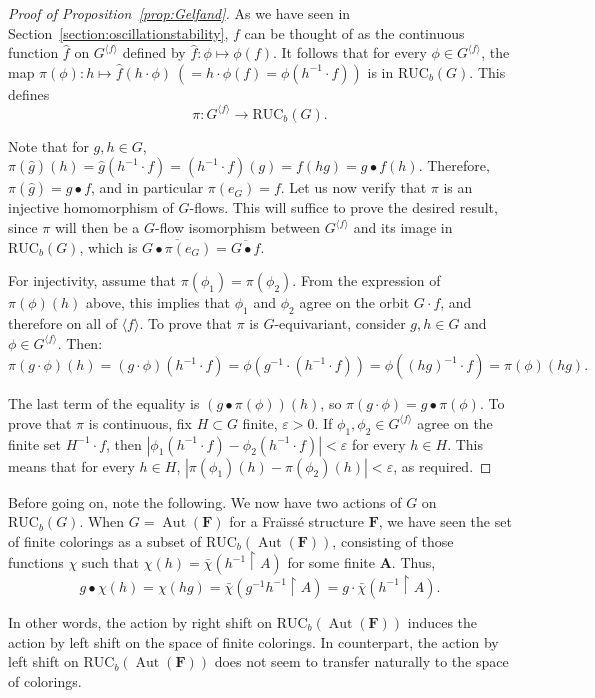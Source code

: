 \documentclass[11pt]{article}
\theoremstyle{definition}
\numberwithin{equation}{section}
\numberwithin{figure}{section}
\numberwithin{table}{section}
\newcommand*{\mA}{\mathbf{A}}
\newcommand*{\mF}{\mathbf{F}}
\newcommand{\restrict}[2]{#1 \upharpoonright #2}
\newcommand{\e}{\varepsilon}
\DeclareMathOperator{\Aut}{Aut}
\newcommand{\RUCB}{\mathrm{RUC}_{b}}
\begin{document}
\begin{proof}[Proof of Proposition~\ref{prop:Gelfand}]
As we have seen in Section~\ref{section:oscillationstability}, $f$ can be thought of as the continuous function $\hat f$ on $G^{\langle f \rangle}$ defined by $\hat f:\phi\mapsto \phi(f)$. It follows that for every $\phi\in G^{\langle f \rangle}$, the map $\pi(\phi):h\mapsto \hat f (h\cdot \phi) \ (=h\cdot \phi(f) = \phi(h^{-1}\cdot f))$ is in $\RUCB(G)$. This defines
\[
\pi:G^{\langle f \rangle}\longrightarrow \RUCB(G).
\]

Note that for $g,h\in G$, $\pi(\hat g)(h)=\hat g(h^{-1}\cdot f)=(h^{-1}\cdot f)(g)=f(hg)=g\bullet f(h)$. Therefore, $\pi(\hat g)=g\bullet f$, and in particular $\pi(e_{G})=f$. Let us now verify that $\pi$ is an injective homomorphism of $G$-flows. This will suffice to prove the desired result, since $\pi$ will then be a $G$-flow isomorphism between $G^{\langle f \rangle}$ and its image in $ \RUCB(G)$, which is $\overline{G\bullet \pi(e_{G})}=\overline{G\bullet f}$.

For injectivity, assume that $\pi(\phi_{1})=\pi(\phi_{2})$. From the expression of $\pi(\phi)(h)$ above, this implies that $\phi_{1}$ and $\phi_{2}$ agree on the orbit $G\cdot f$, and therefore on all of $\langle f \rangle$. To prove that $\pi$ is $G$-equivariant, consider $g,h\in G$ and $\phi\in G^{\langle f \rangle}$. Then:
\[
\pi(g\cdot \phi)(h)=(g\cdot \phi)(h^{-1}\cdot f)=\phi(g^{-1}\cdot(h^{-1}\cdot f))=\phi((hg)^{-1}\cdot f)=\pi(\phi)(hg).
\]

The last term of the equality is $(g\bullet\pi(\phi))(h)$, so $\pi(g\cdot \phi)=g\bullet\pi(\phi)$. To prove that $\pi$ is continuous, fix $H\subset G$ finite, $\e>0$. If $\phi_{1}, \phi_{2}\in G^{\langle f \rangle}$ agree on the finite set $H^{-1}\cdot f$, then $|\phi_{1}(h^{-1}\cdot f)-\phi_{2}(h^{-1}\cdot f)|<\e$ for every $h\in H$. This means that for every $h\in H$, $|\pi(\phi_{1})(h)-\pi(\phi_{2})(h)|<\e$, as required.
\end{proof}

Before going on, note the following. We now have two actions of $G$ on $\RUCB(G)$. When $G=\Aut(\mF)$ for a Fra\"{\i}ss\'e structure $\mF$, we have seen the set of finite colorings as a subset of $\RUCB(\Aut(\mF))$, consisting of those functions $\chi$ such that $\chi(h)=\bar{\chi}({\restrict{h^{-1}}{A}})$ for some finite $\mA$. Thus,
\[
g\bullet \chi (h) = \chi(hg)=\bar\chi(\restrict{g^{-1}h^{-1}}{A})=g\cdot\bar\chi(\restrict{h^{-1}}{A}).
\]

In other words, the action by right shift on $\RUCB(\Aut(\mF))$ induces the action by left shift on the space of finite colorings. In counterpart, the action by left shift on $\RUCB(\Aut(\mF))$ does not seem to transfer naturally to the space of colorings.
\end{document}
